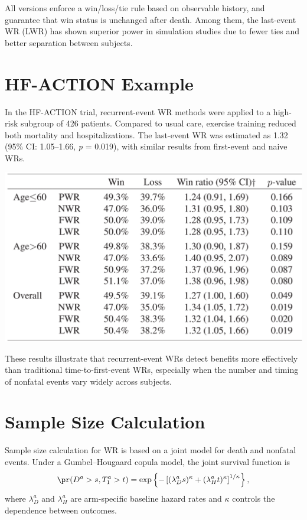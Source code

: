 \documentclass[
  letterpaper,
  DIV=11,
  numbers=noendperiod]{scrreprt}
\begin{document}
All versions enforce a win/loss/tie rule based on observable history,
and guarantee that win status is unchanged after death. Among them, the
last-event WR (LWR) has shown superior power in simulation studies due
to fewer ties and better separation between subjects.

\section{HF-ACTION Example}\label{hf-action-example}

In the HF-ACTION trial, recurrent-event WR methods were applied to a
high-risk subgroup of 426 patients. Compared to usual care, exercise
training reduced both mortality and hospitalizations. The last-event WR
was estimated as 1.32 (95\% CI: 1.05--1.66, \emph{p} = 0.019), with
similar results from first-event and naive WRs.

\begin{center}
\includegraphics[width=0.7\linewidth,height=\textheight,keepaspectratio]{images/test_hfaction_wr.png}
\end{center}

These results illustrate that recurrent-event WRs detect benefits more
effectively than traditional time-to-first-event WRs, especially when
the number and timing of nonfatal events vary widely across subjects.

\section{Sample Size Calculation}\label{sample-size-calculation}

Sample size calculation for WR is based on a joint model for death and
nonfatal events. Under a Gumbel--Hougaard copula model, the joint
survival function is \[
\pr(D^a > s, T_1^a > t) = \exp\left\{ -\left[ (\lambda_D^a s)^\kappa + (\lambda_H^a t)^\kappa \right]^{1/\kappa} \right\},
\] where \(\lambda_D^a\) and \(\lambda_H^a\) are arm-specific baseline
hazard rates and \(\kappa\) controls the dependence between outcomes.
\end{document}
